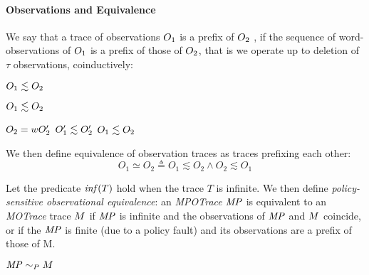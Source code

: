 \documentclass[acmsmall,review,anonymous]{acmart}\settopmatter{printfolios=true,printccs=false,printacmref=false}
\begin{document}
\paragraph*{Observations and Equivalence}

We say that a trace of observations $O_1$ is a prefix of $O_2$
, if the
sequence of word-observations of $O_1$ is a prefix of those of
$O_2$, that is we operate up to deletion of \(\tau\) observations, coinductively:

\judgment{}{\(\obsT \lesssim \obsT\)}

\judgment{}{\(\tau \lesssim \obsT\)}

            {\(O_1 \lesssim O_2\)}

            {\(O_1 \lesssim O_2\)}

              {\(O_2 = w O_2'\)}
              {\(O_1' \lesssim O_2'\)}
              {\(O_1 \lesssim O_2\)}


We then define equivalence of observation traces as traces prefixing each other:
\[O_1 \simeq O_2 \triangleq O_1 \lesssim O_2 \land O_2 \lesssim O_1\]



Let the predicate \(\mathit{inf}(T)\) hold when the trace $T$ is infinite.
We then define {\em policy-sensitive observational equivalence}: an
{\it MPOTrace} \(\mathit{MP}\) is equivalent to an {\it MOTrace} trace \(M\) if \(\mathit{MP}\)
is infinite and the observations of \(\mathit{MP}\) and \(M\) coincide, or if the \(\mathit{MP}\)
is finite (due to a policy fault) and its observations are a prefix of those of M.

            {\(\mathit{MP} \sim_P M\)}
\end{document}
